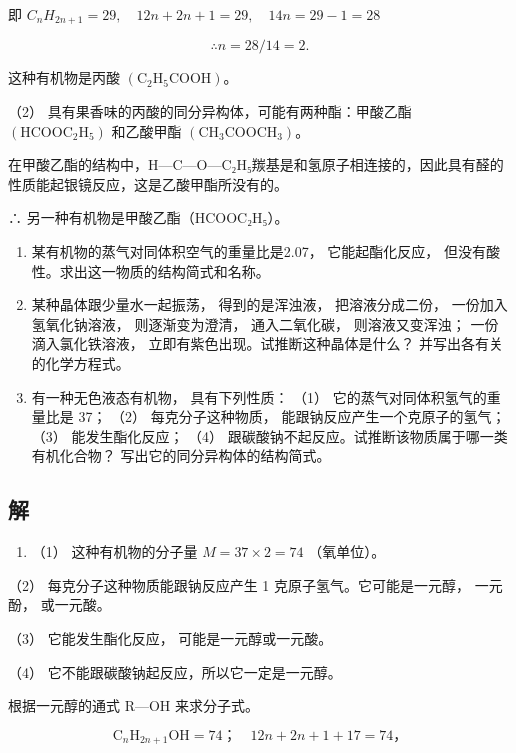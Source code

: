 即 \(C_{n}H_{2n+1}=29,\quad12n+2n+1=29,\quad14n=29-1=28\)

\[
\therefore n = 28 / 14 = 2.
\]

这种有机物是丙酸
\(\left(\mathrm{C}_{2}\mathrm{H}_{5}\mathrm{COOH}\right)\)。

（2） 具有果香味的丙酸的同分异构体，可能有两种酯：甲酸乙酯
\(\left(\mathrm{HCOOC}_{2}\mathrm{H}_{5}\right)\) 和乙酸甲酯
\(\left(\mathrm{CH}_{3}\mathrm{COOCH}_{3}\right)\)。

在甲酸乙酯的结构中，H---C---O---C₂H₅羰基是和氢原子相连接的，因此具有醛的性质能起银镜反应，这是乙酸甲酯所没有的。

∴ 另一种有机物是甲酸乙酯（HCOOC₂H₅）。

\begin{enumerate}[start=6]
\item
  某有机物的蒸气对同体积空气的重量比是2.07， 它能起酯化反应，
  但没有酸性。求出这一物质的结构简式和名称。
\item
  某种晶体跟少量水一起振荡， 得到的是浑浊液， 把溶液分成二份，
  一份加入氢氧化钠溶液， 则逐渐变为澄清， 通入二氧化碳，
  则溶液又变浑浊； 一份滴入氯化铁溶液，
  立即有紫色出现。试推断这种晶体是什么？ 并写出各有关的化学方程式。
\item
  有一种无色液态有机物， 具有下列性质： （1）
  它的蒸气对同体积氢气的重量比是 37； （2） 每克分子这种物质，
  能跟钠反应产生一个克原子的氢气； （3） 能发生酯化反应； （4）
  跟碳酸钠不起反应。试推断该物质属于哪一类有机化合物？
  写出它的同分异构体的结构简式。
\end{enumerate}

\subsection{解}

\begin{enumerate}
\item
  （1） 这种有机物的分子量 \(M = 37 \times 2 = 74\) （氧单位）。
\end{enumerate}

（2） 每克分子这种物质能跟钠反应产生 1 克原子氢气。它可能是一元醇，
一元酚， 或一元酸。

（3） 它能发生酯化反应， 可能是一元醇或一元酸。

（4） 它不能跟碳酸钠起反应，所以它一定是一元醇。

根据一元醇的通式 R---OH 来求分子式。

\[
\mathrm{C} _ {n} \mathrm{H} _ {2 n + 1} \mathrm{OH} = 74\text{；} \quad 12 n + 2 n + 1 + 17 = 74\text{，}
\]

